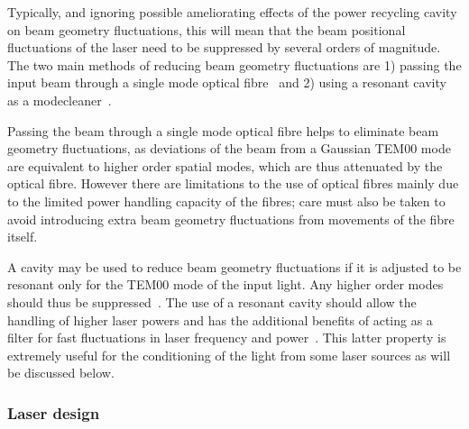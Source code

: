 \documentclass{article}
\begin{document}
\begin{itemize}
Typically, and ignoring possible ameliorating effects of the power recycling
cavity on beam geometry fluctuations, this will mean that the beam positional
fluctuations of the laser need to be suppressed by several orders of magnitude.
The two main methods of reducing beam geometry fluctuations are 1) passing the
input beam through a single mode optical fibre~\cite{Meersphd} and 2) using a
resonant cavity as a modecleaner~\cite{Rudiger, Skeldon, Willke, Araya}.

Passing the beam through a single mode optical fibre helps to eliminate beam
geometry fluctuations, as deviations of the beam from a Gaussian TEM00 mode are
equivalent to higher order spatial modes, which are thus attenuated by the
optical fibre.  However there are limitations to the use of optical fibres
mainly due to the limited power handling capacity of the fibres; care must also
be taken to avoid introducing extra beam geometry fluctuations from movements
of the fibre itself.

A cavity may be used to reduce beam geometry fluctuations if it is adjusted to
be resonant only for the TEM00 mode of the input light. Any higher order modes
should thus be suppressed~\cite{Rudiger}. The use of a resonant cavity should
allow the handling of higher laser powers and has the additional benefits of
acting as a filter for fast fluctuations in laser frequency and
power~\cite{Skeldon, Willke}. This latter property is extremely useful for the
conditioning of the light from some laser sources as will be discussed below.
\end{itemize}


\subsubsection{Laser design}
\label{subsubsection:laserdesign}
\end{document}
